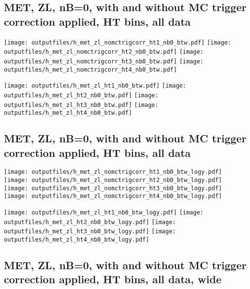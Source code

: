 \documentclass[11pt]{article}
\begin{document}
    \clearpage
     \subsection{ MET, ZL, nB=0, with and without MC trigger correction applied, HT bins, all data}

    \noindent
     \texttt{[image: outputfiles/h\_met\_zl\_nomctrigcorr\_ht1\_nb0\_btw.pdf]}
     \texttt{[image: outputfiles/h\_met\_zl\_nomctrigcorr\_ht2\_nb0\_btw.pdf]}
     \texttt{[image: outputfiles/h\_met\_zl\_nomctrigcorr\_ht3\_nb0\_btw.pdf]}
     \texttt{[image: outputfiles/h\_met\_zl\_nomctrigcorr\_ht4\_nb0\_btw.pdf]}

    \noindent
     \texttt{[image: outputfiles/h\_met\_zl\_ht1\_nb0\_btw.pdf]}
     \texttt{[image: outputfiles/h\_met\_zl\_ht2\_nb0\_btw.pdf]}
     \texttt{[image: outputfiles/h\_met\_zl\_ht3\_nb0\_btw.pdf]}
     \texttt{[image: outputfiles/h\_met\_zl\_ht4\_nb0\_btw.pdf]}

    \clearpage
     \subsection{ MET, ZL, nB=0, with and without MC trigger correction applied, HT bins, all data}

    \noindent
     \texttt{[image: outputfiles/h\_met\_zl\_nomctrigcorr\_ht1\_nb0\_btw\_logy.pdf]}
     \texttt{[image: outputfiles/h\_met\_zl\_nomctrigcorr\_ht2\_nb0\_btw\_logy.pdf]}
     \texttt{[image: outputfiles/h\_met\_zl\_nomctrigcorr\_ht3\_nb0\_btw\_logy.pdf]}
     \texttt{[image: outputfiles/h\_met\_zl\_nomctrigcorr\_ht4\_nb0\_btw\_logy.pdf]}


    \noindent
     \texttt{[image: outputfiles/h\_met\_zl\_ht1\_nb0\_btw\_logy.pdf]}
     \texttt{[image: outputfiles/h\_met\_zl\_ht2\_nb0\_btw\_logy.pdf]}
     \texttt{[image: outputfiles/h\_met\_zl\_ht3\_nb0\_btw\_logy.pdf]}
     \texttt{[image: outputfiles/h\_met\_zl\_ht4\_nb0\_btw\_logy.pdf]}


   \clearpage
     \subsection{ MET, ZL, nB=0, with and without MC trigger correction applied, HT bins, all data, wide}
\end{document}
